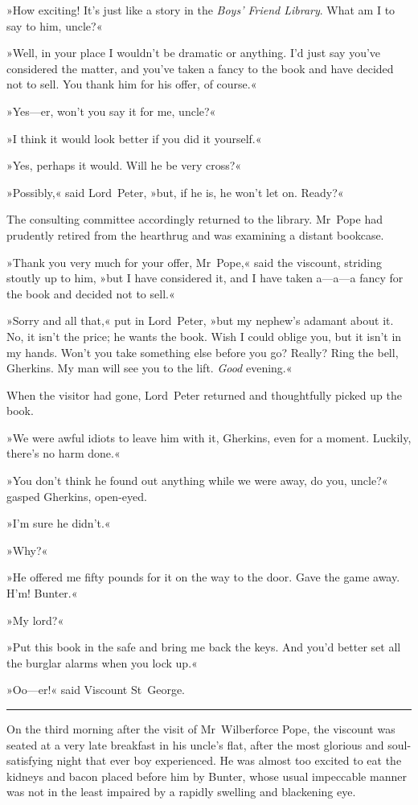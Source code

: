 »How exciting! It's just like a story in the \textit{Boys' Friend Library}. What am I to say to him, uncle?«

»Well, in your place I wouldn't be dramatic or anything. I'd just say you've considered the matter, and you've taken a fancy to the book and have decided not to sell. You thank him for his offer, of course.«

»Yes—er, won't you say it for me, uncle?«

»I think it would look better if you did it yourself.«

»Yes, perhaps it would. Will he be very cross?«

»Possibly,« said Lord~Peter, »but, if he is, he won't let on. Ready?«

The consulting committee accordingly returned to the library. Mr~Pope had prudently retired from the hearthrug and was examining a distant bookcase.

»Thank you very much for your offer, Mr~Pope,« said the viscount, striding stoutly up to him, »but I have considered it, and I have taken a—a—a fancy for the book and decided not to sell.«

»Sorry and all that,« put in Lord~Peter, »but my nephew's adamant about it. No, it isn't the price; he wants the book. Wish I could oblige you, but it isn't in my hands. Won't you take something else before you go? Really? Ring the bell, Gherkins. My man will see you to the lift. \textit{Good} evening.«

When the visitor had gone, Lord~Peter returned and thoughtfully picked up the book.

»We were awful idiots to leave him with it, Gherkins, even for a moment. Luckily, there's no harm done.«

»You don't think he found out anything while we were away, do you, uncle?« gasped Gherkins, open-eyed.

»I'm sure he didn't.«

»Why?«

»He offered me fifty pounds for it on the way to the door. Gave the game away. H'm! Bunter.«

»My lord?«

»Put this book in the safe and bring me back the keys. And you'd better set all the burglar alarms when you lock up.«

»Oo—er!« said Viscount St~George.

\noindent\hfil\rule{0.5\textwidth}{.4pt}\hfil 

On the third morning after the visit of Mr~Wilberforce Pope, the viscount was seated at a very late breakfast in his uncle's flat, after the most glorious and soul-satisfying night that ever boy experienced. He was almost too excited to eat the kidneys and bacon placed before him by Bunter, whose usual impeccable manner was not in the least impaired by a rapidly swelling and blackening eye.

